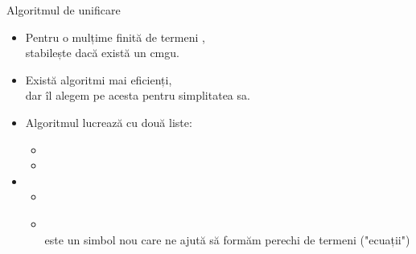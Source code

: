 \documentclass[xcolor=pdftex,romanian,colorlinks]{beamer}
\begin{document}
\begin{frame}{Algoritmul de unificare}
\begin{itemize}
	\item Pentru o mulțime finită de termeni , \\stabilește dacă există un cmgu.
	\vspace{.2cm}
	\item Există algoritmi mai eficienți, \\dar îl alegem pe acesta pentru simplitatea sa.
	\vspace{.2cm}  
	\item Algoritmul lucrează cu două liste:
	\begin{itemize}
		\item {}
		\item {}		
	\end{itemize}
	\vspace{.2cm}  
	\item {}
	\begin{itemize}
		\item {}
		\item {}	 \\
		\intens{$\egf{}$} este un simbol nou care ne ajută să formăm perechi de termeni ("ecuații")	
	\end{itemize}
\end{itemize}
\end{frame}
\end{document}
